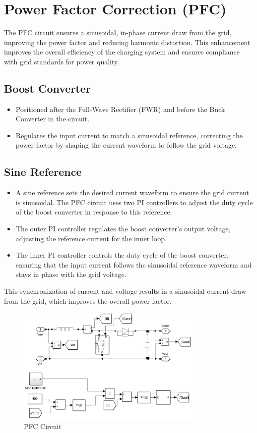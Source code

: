 \documentclass[12pt]{article}
\begin{document}
\section*{Power Factor Correction (PFC)}
The PFC circuit ensures a sinusoidal, in-phase current draw from the grid, improving the power factor and reducing harmonic distortion. This enhancement improves the overall efficiency of the charging system and ensures compliance with grid standards for power quality.

\subsection*{Boost Converter}
\begin{itemize}
    \item Positioned after the Full-Wave Rectifier (FWR) and before the Buck Converter in the circuit.
    \item Regulates the input current to match a sinusoidal reference, correcting the power factor by shaping the current waveform to follow the grid voltage.
\end{itemize}

\subsection*{Sine Reference}
\begin{itemize}
    \item A sine reference sets the desired current waveform to ensure the grid current is sinusoidal. The PFC circuit uses two PI controllers to adjust the duty cycle of the boost converter in response to this reference.
    \item The outer PI controller regulates the boost converter’s output voltage, adjusting the reference current for the inner loop.
    \item The inner PI controller controls the duty cycle of the boost converter, ensuring that the input current follows the sinusoidal reference waveform and stays in phase with the grid voltage.
\end{itemize}
This synchronization of current and voltage results in a sinusoidal current draw from the grid, which improves the overall power factor.
\begin{figure}[h]
    \centering
    \includegraphics[width=0.8\textwidth]{img/pfc_circuit.jpg}
    \caption{PFC Circuit}
\end{figure}
\end{document}
